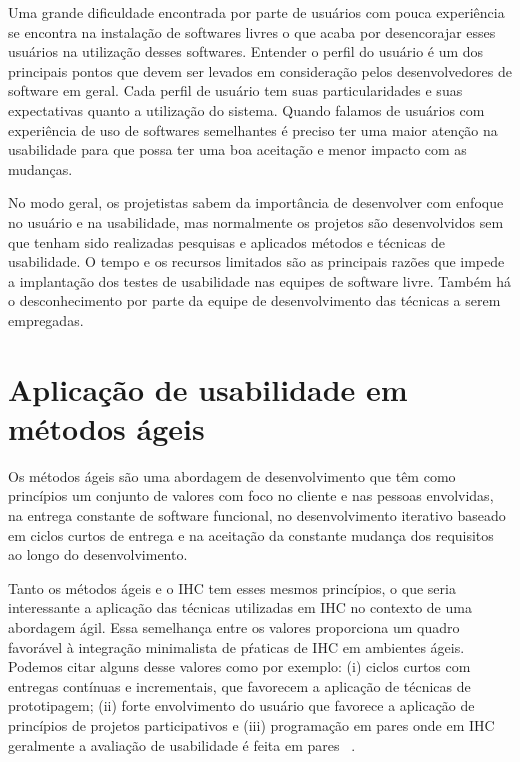 	Uma grande dificuldade encontrada por parte de usuários com pouca experiência se encontra na instalação de softwares livres o que acaba por desencorajar esses usuários na utilização desses softwares. Entender o perfil do usuário é um dos principais pontos que devem ser levados em consideração pelos desenvolvedores de software em geral. Cada perfil de usuário tem suas particularidades e suas expectativas quanto a utilização do sistema. Quando falamos de usuários com experiência de uso de softwares semelhantes é preciso ter uma maior atenção na usabilidade para que possa ter uma boa aceitação e menor impacto com as mudanças.

No modo geral, os projetistas sabem da importância de desenvolver com enfoque no usuário e na usabilidade, mas normalmente os projetos são desenvolvidos sem que tenham sido realizadas pesquisas e aplicados métodos e técnicas de usabilidade.
%	
O tempo e os recursos limitados são as principais razões que impede a implantação dos testes de usabilidade nas equipes de software livre. Também há o desconhecimento por parte da equipe de desenvolvimento das técnicas a serem empregadas.
%





\section{Aplicação de usabilidade em métodos ágeis}
	
	Os métodos ágeis são uma abordagem de desenvolvimento que têm como princípios um conjunto de valores com foco no cliente e nas pessoas envolvidas, na entrega constante de software funcional, no desenvolvimento iterativo baseado em ciclos curtos de entrega e na aceitação da constante mudança dos requisitos ao longo do desenvolvimento. 

	Tanto os métodos ágeis e o IHC tem esses mesmos princípios, o que seria interessante a aplicação das técnicas utilizadas em IHC no contexto de uma abordagem ágil. Essa semelhança entre os valores proporciona um quadro favorável à integração minimalista de pŕaticas de IHC em ambientes ágeis. Podemos citar alguns desse valores como por exemplo: (i) ciclos curtos com entregas contínuas e incrementais, que favorecem a aplicação de técnicas de prototipagem; (ii) forte envolvimento do usuário que favorece a aplicação de princípios de projetos participativos e (iii) programação em pares onde em IHC geralmente a avaliação de usabilidade é feita em pares ~\cite{barbosa2008estrategia}. 

